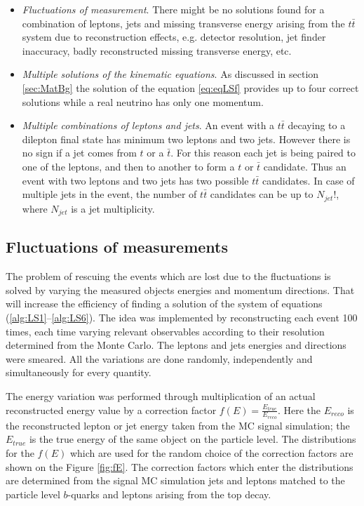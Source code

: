 \begin{itemize}
 \item \textit{Fluctuations of measurement}. There might be no solutions found for a combination
 of leptons, jets and missing transverse energy arising from the $t\bar{t}$ system due to reconstruction effects, e.g. detector resolution,
 jet finder inaccuracy, badly reconstructed missing transverse energy, etc.
 \item \textit{Multiple solutions of the kinematic equations}. As discussed in section \ref{sec:MatBg} the solution of the equation \ref{eq:eqLSf}
 provides up to four correct solutions while a real neutrino has only one momentum.
 \item \textit{Multiple combinations of leptons and jets}. An event with a $t\bar{t}$ decaying to a dilepton final state has minimum two leptons and two
 jets. However there is no sign if a jet comes from $t$ or a $\bar{t}$. For this reason each jet is being paired to one of the leptons, and then to another
 to form a $t$ or $\bar{t}$ candidate. Thus an event with two leptons and two jets has two possible $t\bar{t}$ candidates. In case of multiple jets
 in the event, the number of $t\bar{t}$ candidates can be up to $N_{jet}!$, where $N_{jet}$ is a jet multiplicity.
\end{itemize}


\subsection{Fluctuations of measurements}

The problem of rescuing the events which are lost due to the fluctuations is solved by varying the measured objects energies and
momentum directions. That will increase the efficiency of finding a solution of the system of equations (\ref{alg:LS1}--\ref{alg:LS6}). The idea was implemented by reconstructing
each event 100 times, each time varying relevant observables according to their resolution determined from the Monte Carlo.
The leptons and jets energies and directions were smeared. All the variations are done randomly, independently and simultaneously for every quantity.

The energy variation was performed through multiplication of an actual reconstructed energy value
by a correction factor $f(E) = \frac{E_{true}}{E_{reco}}$. Here the $E_{reco}$ is the reconstructed lepton or jet energy taken from the MC signal simulation;
the $E_{true}$ is the true energy of the same object on the particle level. The distributions for the $f(E)$ which are used for the random choice
of the correction factors are shown on the Figure \ref{fig:fE}. The correction factors which enter the distributions are determined from the signal MC simulation jets and 
leptons matched to the particle level $b$-quarks and leptons arising from the top decay. 

